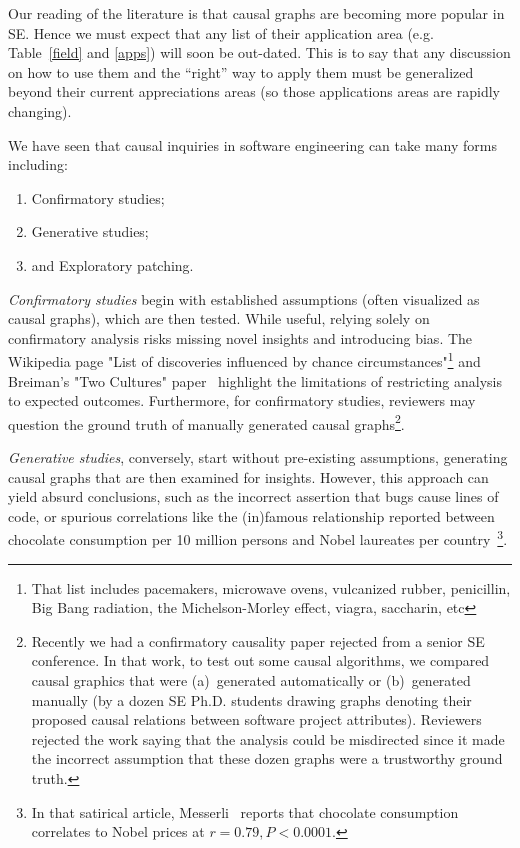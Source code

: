 \documentclass[]{svjour3}
\newif\ifblueresponse
\newcommand{\BLUE}{%
  \begingroup
  \ifblueresponse
    \color{blue}%
  \else
    \color{black}%
  \fi
}
\begin{document}
 \BLUE Our reading of the literature is that causal graphs are becoming more popular in SE. Hence we must expect that any list of their application area (e.g. Table~\ref{field} and \ref{apps})
will soon be out-dated. This is to say that any discussion on how to use them and   the ``right''
way to apply them must be generalized beyond their current appreciations areas (so those applications areas are rapidly changing).  

 

We  have seen that causal inquiries in software engineering can take many forms including:\begin{enumerate}
  \item
  Confirmatory studies;
  \item
  Generative studies;
  \item
  and Exploratory patching.
  \end{enumerate}
  {\em Confirmatory studies} begin with established assumptions (often visualized as causal graphs), which are then tested. While useful, relying solely on confirmatory analysis risks missing novel insights and introducing bias. The Wikipedia page "List of discoveries influenced by chance circumstances"\footnote{ That list includes pacemakers, microwave ovens, vulcanized rubber, penicillin,     Big Bang radiation, the Michelson-Morley effect, viagra, saccharin, etc}    and Breiman's "Two Cultures" paper~\cite{breiman2001statistical} highlight the limitations of restricting analysis to expected outcomes. Furthermore, for confirmatory studies, reviewers may question the ground truth of manually generated causal graphs\footnote{Recently we had a confirmatory causality paper rejected from a senior SE conference. In that work, to test out some causal algorithms, we compared causal graphics that were (a)~generated automatically or (b)~generated manually (by a dozen   SE Ph.D. students drawing   graphs denoting their  proposed causal relations between  software project attributes). Reviewers rejected the work saying that the   analysis could be misdirected since it made the incorrect assumption  that these dozen graphs were a trustworthy ground truth. }. 

 {\em Generative studies}, conversely, start without pre-existing assumptions, generating causal graphs that are then examined for insights. However, this approach can yield absurd conclusions, such as the incorrect assertion that bugs cause lines of code, or spurious correlations like the (in)famous relationship reported  between chocolate consumption  per 10 million persons and Nobel laureates per country~\cite{messerli2012chocolate}\footnote{In that satirical article,
 Messerli~\cite{messerli2012chocolate} reports that chocolate consumption correlates to   Nobel prices at $r=0.79, P<0.0001$.}.
\end{document}
